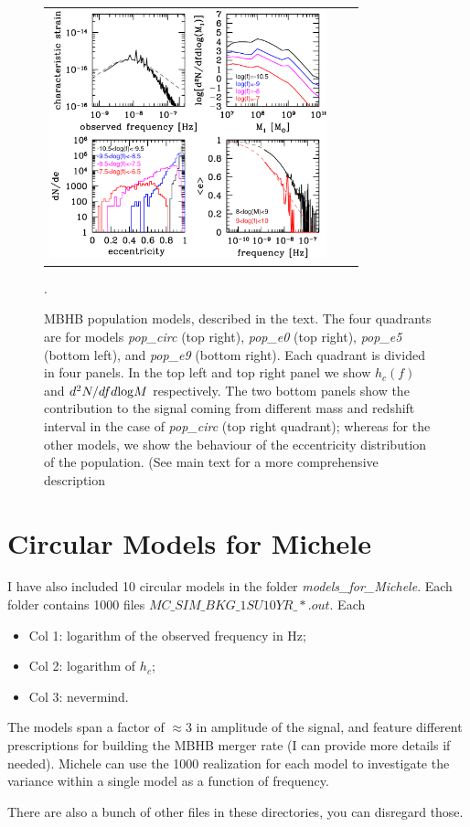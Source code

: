 \documentclass[prd,aps,eqsecnum]{revtex4}
\begin{document}
\begin{figure}
\begin{tabular}{ccc}
\includegraphics[width=8.0cm,clip=true,angle=0]{plots/fig_ecc9}\\
\end{tabular}
\caption{MBHB population models, described in the text. The four quadrants are for models  {\it pop\_circ} (top right), {\it pop\_e0} (top right), {\it pop\_e5} (bottom left), and {\it pop\_e9} (bottom right). Each quadrant is divided in four panels. In the top left and top right panel we show $h_c(f)$ and $d^2N/dfd{\rm log}M$ respectively. The two bottom panels show the contribution to the signal coming from different mass and redshift interval in the case of {\it pop\_circ} (top right quadrant); whereas for the other models, we show the behaviour of the eccentricity distribution of the population. (See main text for a more comprehensive description}.
\label{populations}
\end{figure}

\section{Circular Models for Michele}
I have also included 10 circular models in the folder {\it models\_for\_Michele}. Each folder contains 1000 files $MC\_SIM\_BKG\_1SU10YR\_*.out$. Each\begin{itemize}
\item Col 1: logarithm of the observed frequency in Hz;
\item Col 2: logarithm of $h_c$;
\item Col 3: nevermind.
\end{itemize}
The models span a factor of $\approx3$ in amplitude of the signal, and feature different prescriptions for building the MBHB merger rate (I can provide more details if needed). Michele can use the 1000 realization for each model to investigate the variance within a single model as a function of frequency.

There are also a bunch of other files in these directories, you can disregard those.
\end{document}
